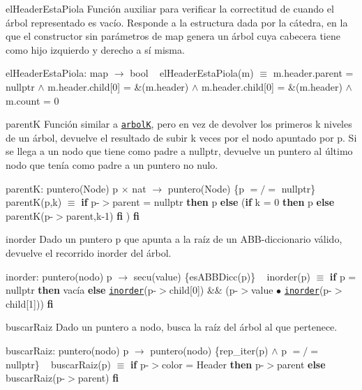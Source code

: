 \begin{DoxyParagraph}{el\+Header\+Esta\+Piola}
Función auxiliar para verificar la correctitud de  cuando el árbol representado es vacío. Responde a la estructura dada por la cátedra, en la que el constructor sin parámetros de map genera un árbol cuya cabecera tiene como hijo izquierdo y derecho a sí misma.

el\+Header\+Esta\+Piola\+: map $\to$ bool ~\newline
el\+Header\+Esta\+Piola(m) $\equiv$ m.\+header.\+parent = nullptr $\land$ m.\+header.\+child\mbox{[}0\mbox{]} = \&(m.\+header) $\land$ m.\+header.\+child\mbox{[}0\mbox{]} = \&(m.\+header) $\land$ m.\+count = 0


\end{DoxyParagraph}
\begin{DoxyParagraph}{parentK}
Función similar a \href{axiomas.html#arbolK}{\tt arbolK}, pero en vez de devolver los primeros k niveles de un árbol, devuelve el resultado de subir k veces por el nodo apuntado por p. Si se llega a un nodo que tiene como padre a nullptr, devuelve un puntero al último nodo que tenía como padre a un puntero no nulo.

parentK\+: puntero(\+Node) p $\times$ nat $\to$ puntero(\+Node) \{p $=/=$ nullptr\} ~\newline
parent\+K(p,k) $\equiv$ {\bfseries if} p-\/$>$parent = nullptr {\bfseries then} p {\bfseries else} ({\bfseries if} k = 0 {\bfseries then} p {\bfseries else} parentK(p-\/$>$parent,k-\/1) {\bfseries fi} ) {\bfseries fi} 


\end{DoxyParagraph}
\begin{DoxyParagraph}{inorder}
Dado un puntero p que apunta a la raíz de un A\+B\+B-\/diccionario válido, devuelve el recorrido inorder del árbol.

inorder\+: puntero(nodo) p $\to$ secu(value) \{es\+A\+B\+B\+Dicc(p)\} ~\newline
inorder(p) $\equiv$ {\bfseries if} p = nullptr {\bfseries then} vacía {\bfseries else} \href{axiomas.html#inorder}{\tt inorder}(p-\/$>$child\mbox{[}0\mbox{]}) \&\& (p-\/$>$value $\bullet$ \href{axiomas.html#inorder}{\tt inorder}(p-\/$>$child\mbox{[}1\mbox{]})) {\bfseries fi} 


\end{DoxyParagraph}
\begin{DoxyParagraph}{buscar\+Raiz}
Dado un puntero a nodo, busca la raíz del árbol al que pertenece.

buscar\+Raiz\+: puntero(nodo) p $\to$ puntero(nodo) \{rep\+\_\+iter(p) $\land$ p $=/=$ nullptr\} ~\newline
buscar\+Raiz(p) $\equiv$ {\bfseries if} p-\/$>$color = Header {\bfseries then} p-\/$>$parent {\bfseries else} buscar\+Raiz(p-\/$>$parent) {\bfseries fi} 


\end{DoxyParagraph}
